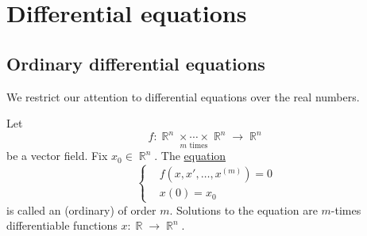 \section{Differential equations}\label{sec:diffeq}
\subsection{Ordinary differential equations}\label{subsec:ordinary_differential_equations}

\begin{remark}\label{rem:real_ode}
  We restrict our attention to differential equations over the real numbers.
\end{remark}

\begin{definition}\label{def:ode}
  Let
  \begin{equation*}
    f: \underset {m \text{ times}} {\BbbR^n \times \cdots \times \BbbR^n} \to \BbbR^n
  \end{equation*}
  be a vector field. Fix \( x_0 \in \BbbR^n \). The \hyperref[ex:equations]{equation}
  \begin{equation*}
    \begin{cases}
       & f(x, x', \ldots, x^{(m)}) = 0 \\
       & x(0) = x_0
    \end{cases}
  \end{equation*}
  is called an (ordinary)  of order \( m \). Solutions to the equation are \( m \)-times differentiable functions \( x: \BbbR \to \BbbR^n \).
\end{definition}
